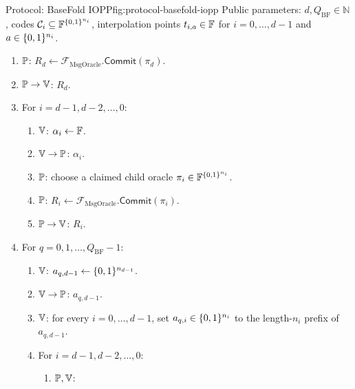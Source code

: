 \begin{protocolbox}{Protocol: BaseFold IOPP}{fig:protocol-basefold-iopp}
\label{fig:protocol-basefold-iopp-query}
\noindent Public parameters: \(d,Q_{\mathrm{BF}}\in\mathbb{N}\), codes
\(\mathcal{C}_i\subseteq\mathbb{F}^{\{0,1\}^{n_i}}\), interpolation points
\(t_{i,a}\in\mathbb{F}\) for \(i=0,\ldots,d-1\) and \(a\in\{0,1\}^{n_i}\).

\smallskip
\begin{enumerate}[leftmargin=0.24in,label=\textbf{P\arabic*.},itemsep=0.08em,topsep=0.1em,parsep=0pt]
  \item \(\mathbb{P}\): \(R_d\gets\mathcal F_{\mathrm{MsgOracle}}.\mathsf{Commit}(\pi_d)\).
  \item \(\mathbb{P}\to\mathbb{V}\): \(R_d\).
  \item For \(i=d-1,d-2,\ldots,0\):
        \begin{enumerate}[leftmargin=0.28in,label=\textbf{P\arabic*.\alph*.},itemsep=0.05em,topsep=0.05em,parsep=0pt]
          \item \(\mathbb{V}\): \(\alpha_i\leftarrow\mathbb{F}\).
          \item \(\mathbb{V}\to\mathbb{P}\): \(\alpha_i\).
          \item \(\mathbb{P}\): choose a claimed child oracle
                \(\pi_i\in\mathbb{F}^{\{0,1\}^{n_i}}\).
          \item \(\mathbb{P}\): \(R_i\gets\mathcal F_{\mathrm{MsgOracle}}.\mathsf{Commit}(\pi_i)\).
          \item \(\mathbb{P}\to\mathbb{V}\): \(R_i\).
        \end{enumerate}
  \item For \(q=0,1,\ldots,Q_{\mathrm{BF}}-1\):
        \begin{enumerate}[leftmargin=0.28in,label=\textbf{P\arabic*.\alph*.},itemsep=0.05em,topsep=0.05em,parsep=0pt]
          \item \(\mathbb{V}\): \(a_{q,d-1}\leftarrow\{0,1\}^{n_{d-1}}\).
          \item \(\mathbb{V}\to\mathbb{P}\): \(a_{q,d-1}\).
          \item \(\mathbb{V}\): for every \(i=0,\ldots,d-1\), set
                \(a_{q,i}\in\{0,1\}^{n_i}\) to the length-\(n_i\) prefix of
                \(a_{q,d-1}\).
          \item For \(i=d-1,d-2,\ldots,0\):
                \begin{enumerate}[leftmargin=0.32in,label=\textbf{P\arabic*.\alph*.\roman*.},itemsep=0.04em,topsep=0.04em,parsep=0pt]
                  \item \(\mathbb{P},\mathbb{V}\):

\end{enumerate}
\end{enumerate}
\end{enumerate}
\end{protocolbox}
